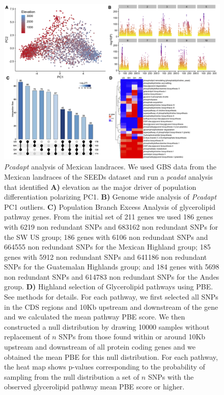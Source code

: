\documentclass[9pt,twocolumn,twoside,lineno]{BioRxiv}
\begin{document}
\begin{figure}[t]
\begin{center}
\includegraphics[width=0.9\paperwidth]{Sup_Figures/Sup_Fig_1.png}
\caption{\textit{Pcadapt} analysis of Mexican landraces. We used GBS data from the Mexican landraces of the SEEDs dataset \cite{Romero_Navarro2017-cn} and run a \textit{pcadat} analysis \cite{Luu2017-ws} that identified \textbf{A)} elevation as the major driver of population differentiation polarizing PC1.  
\textbf{B)} Genome wide analysis of \textit{Pcadapt} PC1 outliers. 
\textbf{C)} Population Branch Excess Analysis of glycerolipid pathway genes.
From the initial set of 211 genes we used 186 genes with 6219 non redundant SNPs and 683162 non redundant SNPs for the SW US group; 186 genes with 6106 non redundant SNPs and 664555 non redundant SNPs for the Mexican Highland group; 185 genes with 5912 non redundant SNPs and 641186 non redundant SNPs for the Guatemalan Highlands group; and 184 genes with 5698 non redundant SNPs and 614783 non redundant SNPs for the Andes group.
\textbf{D)} Highland selection of Glycerolipid pathways using PBE. See methods for details.
For each pathway, we first selected all SNPs in the CDS regions and 10Kb upstream and downstream of the gene and we calculated the mean pathway PBE score. 
We then constructed a null distribution by drawing 10000 samples without replacement of $n$ SNPs from those found within or around 10Kb upstream and downstream of all protein coding genes and we obtained the mean PBE for this null distribution. 
For each pathway, the heat map shows p-values corresponding to the probability of sampling from the null distribution a set of $n$ SNPs with the observed glycerolipid pathway mean PBE score or higher. 
}
\label{SupFig1}
\end{center}
\end{figure} 
\end{document}
